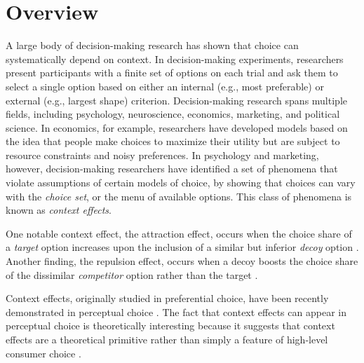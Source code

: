 \section{Overview}
A large body of decision-making research has shown that choice can systematically depend on context. In decision-making experiments, researchers present participants with a finite set of options on each trial and ask them to select a single option based on either an internal (e.g., most preferable) or external (e.g., largest shape) criterion. Decision-making research spans multiple fields, including psychology, neuroscience, economics, marketing, and political science. In economics, for example, researchers have developed models based on the idea that people make choices to maximize their utility but are subject to resource constraints and noisy preferences. In psychology and marketing, however, decision-making researchers have identified a set of phenomena that violate assumptions of certain models of choice, by showing that choices can vary with the \textit{choice set}, or the menu of available options. This class of phenomena is known as \textit{context effects}.


One notable context effect, the attraction effect, occurs when the choice share of a \textit{target} option increases upon the inclusion of a similar but inferior \textit{decoy} option \parencite{huberAddingAsymmetricallyDominated1982d}. Another finding, the repulsion effect, occurs when a decoy boosts the choice share of the dissimilar \textit{competitor} option rather than the target \parencite{simonson2014vices}.  

Context effects, originally studied in preferential choice, have been recently demonstrated in perceptual choice \parencite{trueblood2013not,spektorWhenGoodLooks2018b,liaoInfluenceDistanceDecoy2021,spektorRepulsionEffectPreferential2022,yearsleyContextEffectsSimilarity2022,truebloodPhantomDecoyEffect2017c, turnerCompetingTheoriesMultialternative2018a, evansImpactPresentationOrder2021}. The fact that context effects can appear in perceptual choice is theoretically interesting because it suggests that context effects are a theoretical primitive rather than simply a feature of high-level consumer choice \parencite{trueblood2013not}. 

